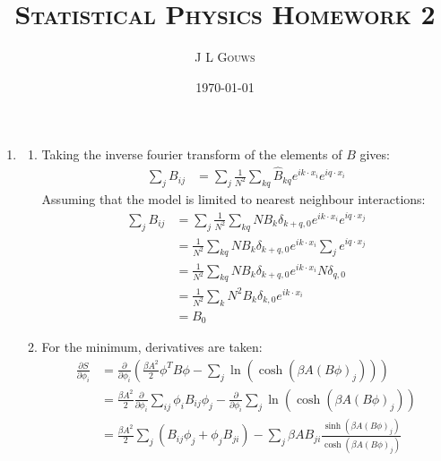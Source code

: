 \documentclass[12pt,a4]{article}
\title{
\textsc{Statistical Physics Homework 2}
}
\author{\textsc{J L Gouws}
}
\date{\today
\\[1cm]}
\begin{document}
\thispagestyle{empty}

\maketitle

\begin{enumerate}
  \item
    \begin{enumerate}
      \item
        Taking the inverse fourier transform of the elements of $B$ gives:
        \begin{align*}
          \sum_j B_{ij} 
                        &= \sum_{j}  \frac{1}{N^2} \sum_{k q} \hat B_{kq} e^{i k \cdot x_i} e^{i q \cdot x_i}
        \end{align*}
        Assuming that the model is limited to nearest neighbour interactions:
        \begin{align*}
          \sum_j B_{ij} 
                        &= \sum_{j}  \frac{1}{N^2} \sum_{k q} N B_k \delta_{k + q, 0} e^{i k \cdot x_i} e^{i q \cdot x_j}\\
                        &=   \frac{1}{N^2} \sum_{k q} N B_k \delta_{k + q, 0} e^{i k \cdot x_i} \sum_{j} e^{i q \cdot x_j}\\
                        &=   \frac{1}{N^2} \sum_{k q} N B_k \delta_{k + q, 0} e^{i k \cdot x_i} N \delta_{q,0}\\
                        &=   \frac{1}{N^2} \sum_{k} N^2 B_k \delta_{k, 0} e^{i k \cdot x_i} \\
                        &=   B_0 
        \end{align*}
      \item
        For the minimum, derivatives are taken:
        \begin{align*}
          \frac{\partial S}{\partial \phi_i} &= \frac{\partial }{\partial \phi_i}\left(\frac{\beta A^2}{2} \phi^T B \phi - \sum_j \ln(\cosh(\beta A (B \phi)_j))\right)\\
                                             &= \frac{\beta A^2}{2} \frac{\partial }{\partial \phi_i}\sum_{ij}\phi_i B_{ij} \phi_j - \frac{\partial }{\partial \phi_i}\sum_j \ln(\cosh(\beta A (B \phi)_j))\\
                                             &= \frac{\beta A^2}{2} \sum_{j} \left( B_{ij} \phi_j + \phi_jB_{ji} \right) - \sum_j \beta A B_{ji}\frac{\sinh(\beta A (B \phi)_j)}{\cosh(\beta A (B \phi)_j)}\\

\end{align*}
\end{enumerate}
\end{enumerate}
\end{document}
